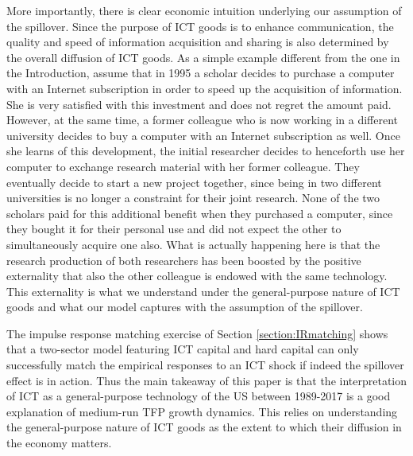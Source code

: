 \documentclass[12pt]{article}
\begin{document}
More importantly, there is clear economic intuition underlying our assumption of the spillover. Since the purpose of ICT goods is to enhance communication, the quality and speed of information acquisition and sharing is also determined by the overall diffusion of ICT goods. As a simple example different from the one in the Introduction, assume that in 1995 a scholar decides to purchase a computer with an Internet subscription in order to speed up the acquisition of information. She is very satisfied with this investment and does not regret the amount paid. However, at the same time, a former colleague who is now working in a different university decides to buy a computer with an Internet subscription as well. Once she learns of this development, the initial researcher decides to henceforth use her computer to exchange research material with her former colleague. They eventually decide to start a new project together, since being in two different universities is no longer a constraint for their joint research. None of the two scholars paid for this additional benefit when they purchased a computer, since they bought it for their personal use and did not expect the other to simultaneously acquire one also. What is actually happening here is that the research production of both researchers has been boosted by the positive externality that also the other colleague is endowed with the same technology. This externality is what we understand under the general-purpose nature of ICT goods and what our model captures with the assumption of the spillover.

The impulse response matching exercise of Section \ref{section:IRmatching} shows that a two-sector model featuring ICT capital and hard capital can only successfully match the empirical responses to an ICT shock if indeed the spillover effect is in action. Thus the main takeaway of this paper is that the interpretation of ICT as a general-purpose technology of the US between 1989-2017 is a good explanation of medium-run TFP growth dynamics. This relies on understanding the general-purpose nature of ICT goods as the extent to which their diffusion in the economy matters. 

\end{document}
